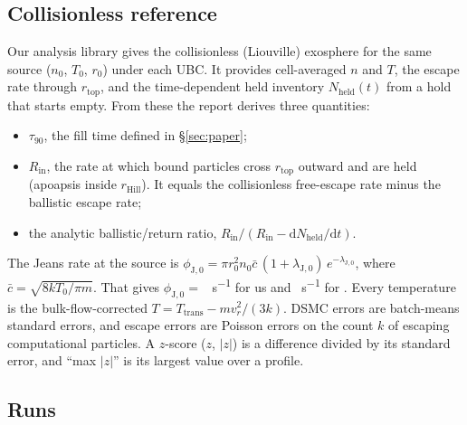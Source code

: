 \documentclass[10pt]{article}
\newcommand{\sinv}{s\textsuperscript{−1}}
\newcommand{\tauf}{\tau_{90}}
\newcommand{\rtop}{r_\mathrm{top}}
\newcommand{\rhill}{r_\mathrm{Hill}}
\begin{document}
\subsection{Collisionless reference}\label{sec:ref}

Our analysis library gives the collisionless (Liouville) exosphere for the same source ($n_0$, $T_0$, $r_0$) under each UBC. It provides cell-averaged $n$ and $T$, the escape rate through $\rtop$, and the time-dependent held inventory $N_\mathrm{held}(t)$ from a hold that starts empty. From these the report derives three quantities:
\begin{itemize}
  \item $\tauf$, the fill time defined in \S\ref{sec:paper};
  \item $R_\mathrm{in}$, the rate at which bound particles cross $\rtop$ outward and are held (apoapsis inside $\rhill$). It equals the collisionless free-escape rate minus the ballistic escape rate;
  \item the analytic ballistic/return ratio, $R_\mathrm{in}/(R_\mathrm{in} - \mathrm{d}N_\mathrm{held}/\mathrm{d}t)$.
\end{itemize}
The Jeans rate at the source is $\phi_{\mathrm{J},0} = \pi r_0^2 n_0 \bar c\,(1+\lambda_{\mathrm{J},0})\,e^{-\lambda_{\mathrm{J},0}}$, where $\bar c = \sqrt{8kT_0/\pi m}$. That gives $\phi_{\mathrm{J},0} = $ \oPhiJZero{}~\sinv{} for us and \pPhiJZero{}~\sinv{} for \citet{cm21}. Every temperature is the bulk-flow-corrected $T = T_\mathrm{trans} - m v_r^2/(3k)$. DSMC errors are batch-means standard errors, and escape errors are Poisson errors on the count $k$ of escaping computational particles. A $z$-score ($z$, $|z|$) is a difference divided by its standard error, and “max $|z|$” is its largest value over a profile.

\subsection{Runs}\label{sec:runs}
\end{document}
